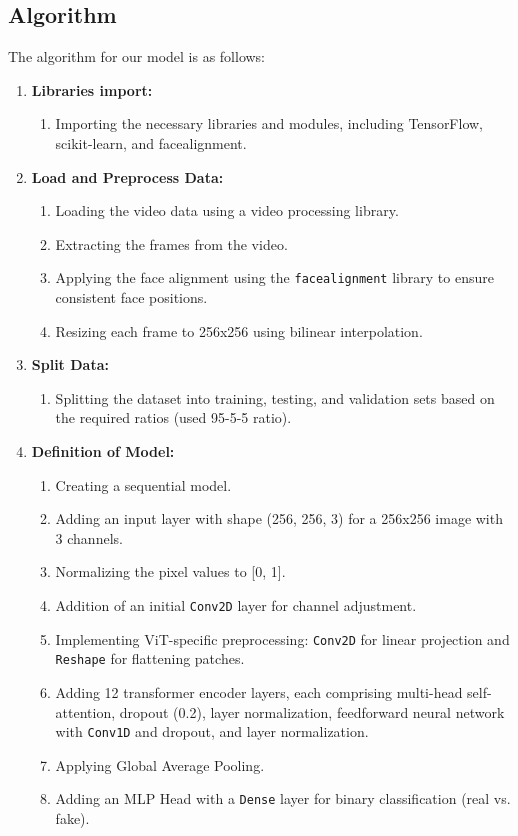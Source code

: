 \subsection{Algorithm}
The algorithm  for our model is as follows:

\begin{enumerate}
    \item \textbf{Libraries import:}
          \begin{enumerate}
             \item Importing the necessary libraries and modules, including TensorFlow, scikit-learn, and facealignment.
          \end{enumerate}
 
    \item \textbf{Load and Preprocess Data:}
          \begin{enumerate}
             \item Loading the video data using a video processing library.
             \item Extracting the frames from the video.
             \item Applying the face alignment using the \texttt{facealignment} library to ensure consistent face positions.
             \item Resizing each frame to 256x256 using bilinear interpolation.
          \end{enumerate}
 
    \item \textbf{Split Data:}
          \begin{enumerate}
             \item Splitting the dataset into training, testing, and validation sets based on the required ratios (used 95-5-5 ratio).
          \end{enumerate}
 
    \item \textbf{Definition of Model:}
          \begin{enumerate}
             \item Creating a sequential model.
             \item Adding an input layer with shape (256, 256, 3) for a 256x256 image with 3 channels.
             \item Normalizing the pixel values to [0, 1].
             \item Addition of an initial \texttt{Conv2D} layer for channel adjustment.
             \item Implementing ViT-specific preprocessing: \texttt{Conv2D} for linear projection and \texttt{Reshape} for flattening patches.
             \item Adding 12 transformer encoder layers, each comprising multi-head self-attention, dropout (0.2), layer normalization, feedforward neural network with \texttt{Conv1D} and dropout, and layer normalization.
             \item Applying Global Average Pooling.
             \item Adding an MLP Head with a \texttt{Dense} layer for binary classification (real vs. fake).
          \end{enumerate}
 

\end{enumerate}
